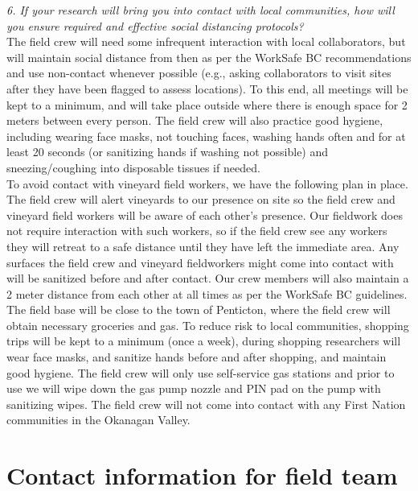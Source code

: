 \documentclass[11pt,letter]{article}
\begin{document}
\emph{6. If your research will bring you into contact with local communities, how will you ensure required and effective social distancing protocols?}\\

The field crew will need some infrequent interaction with local collaborators, but will maintain social distance from then as per the WorkSafe BC recommendations and use non-contact whenever possible (e.g., asking collaborators to visit sites after they have been flagged to assess locations). To this end, all meetings will be kept to a minimum, and will take place outside where there is enough space for 2 meters between every person. The field crew will also practice good hygiene, including wearing face masks, not touching faces, washing hands often and for at least 20 seconds (or sanitizing hands if washing not possible) and sneezing/coughing into disposable tissues if needed. \\

To avoid contact with vineyard field workers, we have the following plan in place. The field crew will alert vineyards to our presence on site so the field crew and vineyard field workers will be aware of each other's presence. Our fieldwork does not require interaction with such workers, so if the field crew see any workers they will retreat to a safe distance until they have left the immediate area. Any surfaces the field crew and vineyard fieldworkers might come into contact with will be sanitized before and after contact. Our crew members will also maintain a 2 meter distance from each other at all times as per the WorkSafe BC guidelines. \\

The field base will be close to the town of Penticton, where the field crew will obtain necessary groceries and gas. To reduce risk to local communities, shopping trips will be kept to a minimum (once a week), during shopping researchers will wear face masks, and sanitize hands before and after shopping, and maintain good hygiene. The field crew will only use self-service gas stations and prior to use we will wipe down the gas pump nozzle and PIN pad on the pump with sanitizing wipes. The field crew will not come into contact with any First Nation communities in the Okanagan Valley.\\ 

\clearpage

\section{Contact information for field team}
\end{document}
